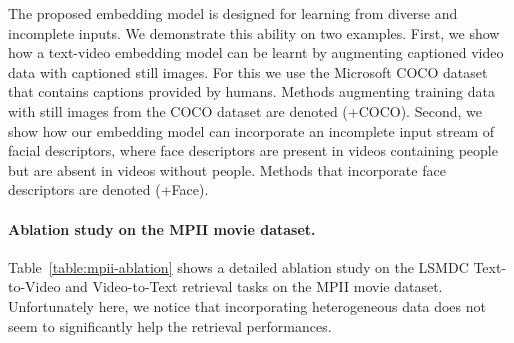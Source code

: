 \documentclass[runningheads]{llncs}
\begin{document}
The proposed embedding model is designed for learning from diverse and incomplete inputs. We demonstrate this ability on two examples. First, we show how a text-video embedding model can be learnt by augmenting captioned video data with captioned still images. For this we use the Microsoft COCO dataset~\cite{lin14coco} that contains captions provided by humans. Methods augmenting training data with still images from the COCO dataset are denoted (+COCO). Second, we show how our embedding model can incorporate an incomplete input stream of facial descriptors, where face descriptors are present in videos containing people but are absent in videos without people. Methods that incorporate face descriptors are denoted (+Face).


\paragraph{Ablation study on the MPII movie dataset.}
Table~\ref{table:mpii-ablation} shows a detailed ablation study on the LSMDC Text-to-Video and Video-to-Text retrieval tasks on the MPII movie dataset. 
Unfortunately here, we notice that incorporating heterogeneous data does not seem to significantly help the retrieval performances.


\begin{table}[t]
  \setlength{\tabcolsep}{3pt}
      \caption{\small The effect of augmenting the MPII movie caption dataset with captioned still images from the MS COCO dataset. R@k denotes recall@k (higher is better), MR denotes Median Rank (lower is better) and MC denotes Multiple Choice (higher is better).}
    \centering
      \label{table:coco-comparison}
\end{table}
\end{document}
